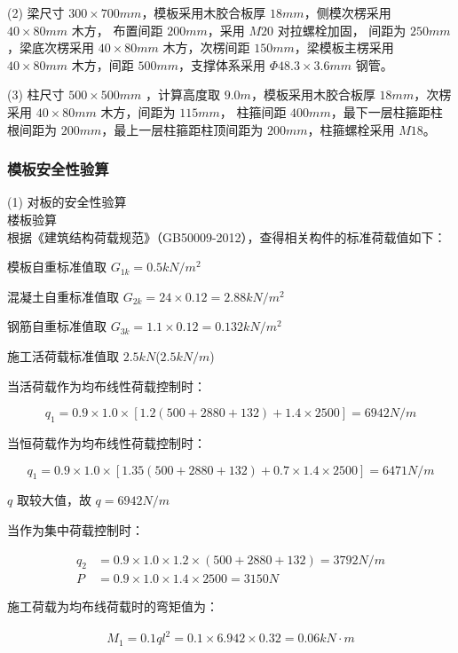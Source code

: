 (2) 梁尺寸 $300\times 700mm$，模板采用木胶合板厚 $18mm$，侧模次楞采用 $40\times 80mm$ 木方， 布置间距 $200mm$，采用 $M20$ 对拉螺栓加固，
间距为 $250mm$，梁底次楞采用 $40\times 80mm$ 木方，次楞间距 $150mm$，梁模板主楞采用 $40\times 80mm$ 木方，间距 $500mm$，支撑体系采用 $Φ48.3\times 3.6mm$ 钢管。

(3) 柱尺寸 $500\times 500mm$ ，计算高度取 $9.0m$，模板采用木胶合板厚 $18mm$，次楞采用 $40\times 80mm$ 木方，间距为 $115mm$，
柱箍间距 $400mm$，最下一层柱箍距柱根间距为 $200mm$，最上一层柱箍距柱顶间距为 $200mm$，柱箍螺栓采用 $M18$。

\subsubsection{模板安全性验算}

(1) 对板的安全性验算\\

 楼板验算\\

根据《建筑结构荷载规范》（GB50009-2012），查得相关构件的标准荷载值如下：

模板自重标准值取 $G_{1k}=0.5 kN/m^2$

混凝土自重标准值取 $G_{2k}=24\times 0.12=2.88 kN/m^2 $

钢筋自重标准值取 $G_{3k}=1.1\times 0.12=0.132 kN/m^2$

施工活荷载标准值取 $2.5kN$($2.5kN/m$)

当活荷载作为均布线性荷载控制时：

\[q_1=0.9\times 1.0\times [1.2(500+2880+132)+1.4\times 2500]=6942 N/m\]

当恒荷载作为均布线性荷载控制时：

\[q_1=0.9\times 1.0\times [1.35(500+2880+132)+0.7\times 1.4\times 2500]=6471 N/m\]

$q$ 取较大值，故 $q=6942 N/m$

当作为集中荷载控制时：

\begin{align*}
    q_2&=0.9\times 1.0\times 1.2\times (500+2880+132)=3792 N/m\\
    P&=0.9\times 1.0\times 1.4\times 2500=3150N
\end{align*}

施工荷载为均布线荷载时的弯矩值为：

\begin{align}
    \label{fx:5.0}
    M_1=0.1ql^2=0.1\times 6.942\times 0.32=0.06kN\cdot m
\end{align}

